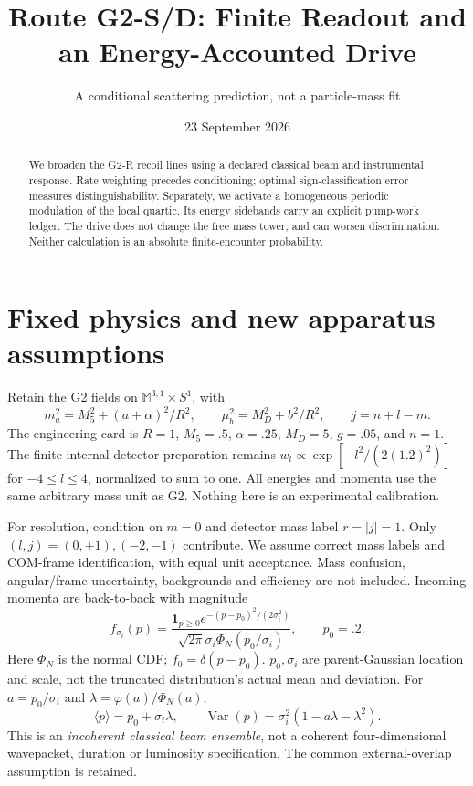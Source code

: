 \documentclass[11pt,a4paper]{article}
\title{Route G2-S/D: Finite Readout and an Energy-Accounted Drive}
\author{A conditional scattering prediction, not a particle-mass fit}
\date{23 September 2026}
\begin{document}
\maketitle
\begin{abstract}
We broaden the G2-R recoil lines using a declared classical beam and
instrumental response. Rate weighting precedes conditioning; optimal
sign-classification error measures distinguishability. Separately, we
activate a homogeneous periodic modulation of the local quartic.
Its energy sidebands carry an explicit pump-work ledger. The drive
does not change the free mass tower, and can worsen discrimination.
Neither calculation is an absolute finite-encounter probability.
\end{abstract}

\section{Fixed physics and new apparatus assumptions}
Retain the G2 fields on $\mathbb M^{3,1}\times S^1$, with
\begin{equation}
 m_a^2=M_5^2+(a+\alpha)^2/R^2,\qquad
 \mu_b^2=M_D^2+b^2/R^2,\qquad j=n+l-m.
\end{equation}
The engineering card is $R=1$, $M_5=.5$, $\alpha=.25$, $M_D=5$,
$g=.05$, and $n=1$. The finite internal detector preparation remains
$w_l\propto\exp[-l^2/(2(1.2)^2)]$ for $-4\leq l\leq4$,
normalized to sum to one. All energies and momenta use the same
arbitrary mass unit as G2. Nothing here is an experimental calibration.

For resolution, condition on $m=0$ and detector mass label $r=|j|=1$.
Only $(l,j)=(0,+1),(-2,-1)$ contribute. We assume correct mass labels
and COM-frame identification, with equal unit acceptance.
Mass confusion, angular/frame uncertainty, backgrounds and efficiency
are not included. Incoming momenta are back-to-back with magnitude
\begin{equation}\label{eq:beam}
 f_{\sigma_i}(p)=
 \frac{\mathbf1_{p\geq0}e^{-(p-p_0)^2/(2\sigma_i^2)}}
 {\sqrt{2\pi}\sigma_i\Phi_{\!N}(p_0/\sigma_i)},\qquad p_0=.2 .
\end{equation}
Here $\Phi_{\!N}$ is the normal CDF; $f_0=\delta(p-p_0)$.
$p_0,\sigma_i$ are parent-Gaussian location and scale, not the
truncated distribution's actual mean and deviation.
For $a=p_0/\sigma_i$ and $\lambda=\varphi(a)/\Phi_{\!N}(a)$,
\begin{equation}
 \langle p\rangle=p_0+\sigma_i\lambda,\qquad
 \operatorname{Var}(p)=\sigma_i^2(1-a\lambda-\lambda^2).
\end{equation}
This is an \emph{incoherent classical beam ensemble}, not a coherent
four-dimensional wavepacket, duration or luminosity specification.
The common external-overlap assumption is retained.
\end{document}
